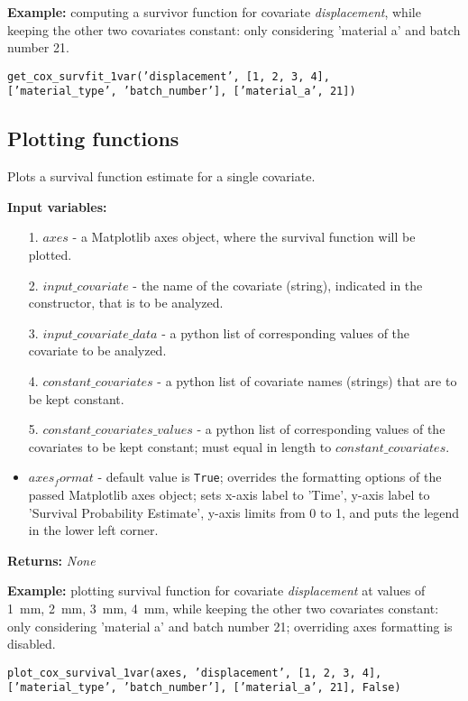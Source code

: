 \documentclass[twoside,a4paper]{refart}
\begin{document}
\textbf{Example:} computing a survivor function for covariate \textit{displacement}, while keeping the other two covariates constant: only considering 'material a' and batch number 21.

\texttt{get\_cox\_survfit\_1var('displacement', [1, 2, 3, 4],} \\ 
\texttt{['material\_type', 'batch\_number'], ['material\_a', 21])}


\subsection{Plotting functions}

Plots a survival function estimate for a single covariate.

\textbf{Input variables:}
\begin{itemize}
    \item[1.] $axes$ - a Matplotlib axes object, where the survival function will be plotted.
    \item[2.] $input\_covariate$ - the name of the covariate (string), indicated in the constructor, that is to be analyzed.
    \item[3.] $input\_covariate\_data$ - a python list of corresponding values of the covariate to be analyzed.
    \item[4.] $constant\_covariates$ - a python list of covariate names (strings) that are to be kept constant.
    \item[5.] $constant\_covariates\_values$ - a python list of corresponding values of the covariates to be kept constant; must equal in length to $constant\_covariates$.
    \item $axes_format$ - default value is \texttt{True}; overrides the formatting options of the passed Matplotlib axes object; sets x-axis label to 'Time', y-axis label to 'Survival Probability Estimate', y-axis limits from 0 to 1, and puts the legend in the lower left corner.
\end{itemize}

\textbf{Returns:} \textit{None}

\textbf{Example:} plotting survival function for covariate \textit{displacement} at values of 1~mm, 2~mm, 3~mm, 4~mm, while keeping the other two covariates constant: only considering 'material a' and batch number 21;  overriding axes formatting is disabled.

\texttt{plot\_cox\_survival\_1var(axes, 'displacement', [1, 2, 3, 4],} \\
\texttt{['material\_type', 'batch\_number'], ['material\_a', 21], False)}
\end{document}
